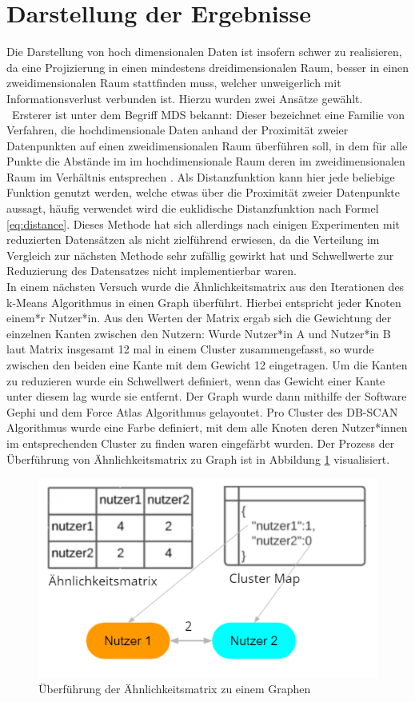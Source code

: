 \section{Darstellung der Ergebnisse}
Die Darstellung von hoch dimensionalen Daten ist insofern schwer zu realisieren, da eine Projizierung in einen mindestens dreidimensionalen Raum, besser in einen zweidimensionalen Raum stattfinden muss, welcher unweigerlich mit Informationsverlust verbunden ist. Hierzu wurden zwei Ansätze gewählt. \\ \newline\
Ersterer ist unter dem Begriff \ac{MDS} bekannt: Dieser bezeichnet eine Familie von Verfahren, die hochdimensionale Daten anhand der Proximität zweier Datenpunkten auf einen zweidimensionalen Raum überführen soll, in dem für alle Punkte die Abstände im im hochdimensionale Raum deren im zweidimensionalen Raum im Verhältnis entsprechen \cite{Borg.2010}. Als Distanzfunktion kann hier jede beliebige Funktion genutzt werden, welche etwas über die Proximität zweier Datenpunkte aussagt, häufig verwendet wird die euklidische Distanzfunktion nach Formel \ref{eq:distance}. Dieses Methode hat sich allerdings nach einigen Experimenten mit reduzierten Datensätzen als nicht zielführend erwiesen, da die Verteilung im Vergleich zur nächsten Methode sehr zufällig gewirkt hat und Schwellwerte zur Reduzierung des Datensatzes nicht implementierbar waren. \\ \newline
In einem nächsten Versuch wurde die Ähnlichkeitsmatrix aus den Iterationen des k-Means Algorithmus in einen Graph überführt. Hierbei entspricht jeder Knoten einem*r Nutzer*in. Aus den Werten der Matrix ergab sich die Gewichtung der einzelnen Kanten zwischen den Nutzern: Wurde Nutzer*in A und Nutzer*in B laut Matrix insgesamt 12 mal in einem Cluster zusammengefasst, so wurde zwischen den beiden eine Kante mit dem Gewicht 12 eingetragen. Um die Kanten zu reduzieren wurde ein Schwellwert definiert, wenn das Gewicht einer Kante unter diesem lag wurde sie entfernt. Der Graph wurde dann mithilfe der Software Gephi und dem Force Atlas Algorithmus gelayoutet. Pro Cluster des DB-SCAN Algorithmus wurde eine Farbe definiert, mit dem alle Knoten deren Nutzer*innen im entsprechenden Cluster zu finden waren eingefärbt wurden. Der Prozess der Überführung von Ähnlichkeitsmatrix zu Graph ist in Abbildung \ref{fig:consensus_matrix_to_graph} visualisiert. \\ \newline
\begin{figure}[h]
	\centering
	\includegraphics[width=0.6\linewidth]{images/consensus_matrix_to_graph}
	\caption{Überführung der Ähnlichkeitsmatrix zu einem Graphen}
	\label{fig:consensus_matrix_to_graph}
\end{figure}
